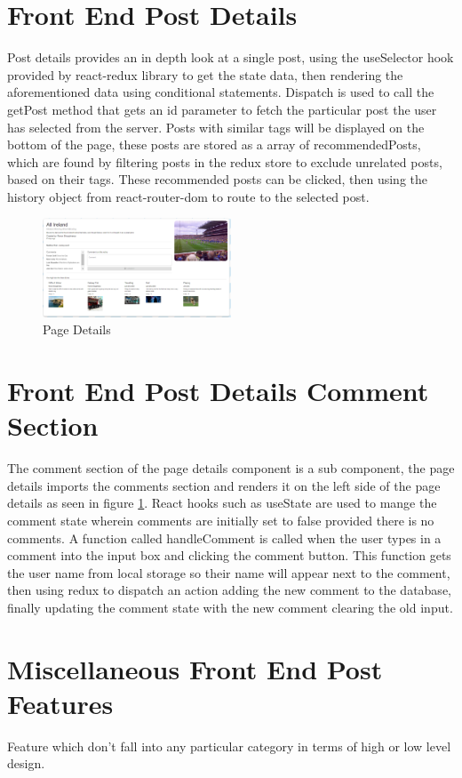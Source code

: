 \section{Front End Post Details}
Post details provides an in depth look at a single post, using the useSelector hook provided by react-redux library to get the state data, then rendering the aforementioned data using conditional statements. Dispatch is used to call the getPost method that gets an id parameter to fetch the particular post the user has selected from the server. Posts with similar tags will be displayed on the bottom of the page, these posts are stored as a array of recommendedPosts, which are found by filtering posts in the redux store to exclude unrelated posts, based on their tags. These recommended posts can be clicked, then using the history object from react-router-dom to route to the selected post.
\begin{figure}[h!]
    \centering
    \includegraphics[width=0.5\textwidth]{images/PageDetails.png}
    \caption{Page Details}
    \label{image:PageDetails}
\end{figure}
\section{Front End Post Details Comment Section}
The comment section of the page details component is a sub component, the page details imports the comments section and renders it on the left side of the page details as seen in figure \ref{image:PageDetails}. React hooks such as useState are used to mange the comment state wherein comments are initially set to false provided there is no comments. A function called handleComment is called when the user types in a comment into the input box and clicking the comment button. This function gets the user name from local storage so their name will appear next to the comment, then using redux to dispatch an action adding the new comment to the database, finally updating the comment state with the new comment clearing the old input.

\section{Miscellaneous Front End Post Features}
Feature which don't fall into any particular category in terms of high or low level design.

